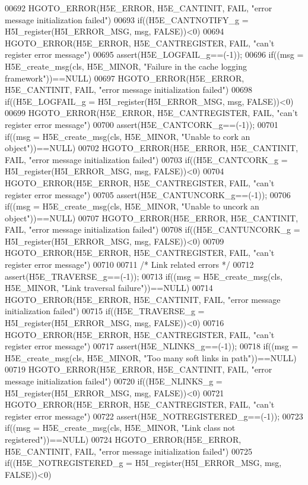\begin{DoxyCode}
00692     HGOTO\_ERROR(H5E\_ERROR, H5E\_CANTINIT, FAIL, "error message initialization failed")
00693 if((H5E\_CANTNOTIFY\_g = H5I\_register(H5I\_ERROR\_MSG, msg, FALSE))<0)
00694     HGOTO\_ERROR(H5E\_ERROR, H5E\_CANTREGISTER, FAIL, "can't register error message")
00695 assert(H5E\_LOGFAIL\_g==(-1));
00696 if((msg = H5E\_create\_msg(cls, H5E\_MINOR, "Failure in the cache logging framework"))==NULL)
00697     HGOTO\_ERROR(H5E\_ERROR, H5E\_CANTINIT, FAIL, "error message initialization failed")
00698 if((H5E\_LOGFAIL\_g = H5I\_register(H5I\_ERROR\_MSG, msg, FALSE))<0)
00699     HGOTO\_ERROR(H5E\_ERROR, H5E\_CANTREGISTER, FAIL, "can't register error message")
00700 assert(H5E\_CANTCORK\_g==(-1));
00701 if((msg = H5E\_create\_msg(cls, H5E\_MINOR, "Unable to cork an \textcolor{keywordtype}{object}"))==NULL)
00702     HGOTO\_ERROR(H5E\_ERROR, H5E\_CANTINIT, FAIL, "error message initialization failed")
00703 if((H5E\_CANTCORK\_g = H5I\_register(H5I\_ERROR\_MSG, msg, FALSE))<0)
00704     HGOTO\_ERROR(H5E\_ERROR, H5E\_CANTREGISTER, FAIL, "can't register error message")
00705 assert(H5E\_CANTUNCORK\_g==(-1));
00706 if((msg = H5E\_create\_msg(cls, H5E\_MINOR, "Unable to uncork an \textcolor{keywordtype}{object}"))==NULL)
00707     HGOTO\_ERROR(H5E\_ERROR, H5E\_CANTINIT, FAIL, "error message initialization failed")
00708 if((H5E\_CANTUNCORK\_g = H5I\_register(H5I\_ERROR\_MSG, msg, FALSE))<0)
00709     HGOTO\_ERROR(H5E\_ERROR, H5E\_CANTREGISTER, FAIL, "can't register error message")
00710 
00711 \textcolor{comment}{/* Link related errors */}
00712 assert(H5E\_TRAVERSE\_g==(-1));
00713 if((msg = H5E\_create\_msg(cls, H5E\_MINOR, "Link traversal failure"))==NULL)
00714     HGOTO\_ERROR(H5E\_ERROR, H5E\_CANTINIT, FAIL, "error message initialization failed")
00715 if((H5E\_TRAVERSE\_g = H5I\_register(H5I\_ERROR\_MSG, msg, FALSE))<0)
00716     HGOTO\_ERROR(H5E\_ERROR, H5E\_CANTREGISTER, FAIL, "can't register error message")
00717 assert(H5E\_NLINKS\_g==(-1));
00718 if((msg = H5E\_create\_msg(cls, H5E\_MINOR, "Too many soft links in path"))==NULL)
00719     HGOTO\_ERROR(H5E\_ERROR, H5E\_CANTINIT, FAIL, "error message initialization failed")
00720 if((H5E\_NLINKS\_g = H5I\_register(H5I\_ERROR\_MSG, msg, FALSE))<0)
00721     HGOTO\_ERROR(H5E\_ERROR, H5E\_CANTREGISTER, FAIL, "can't register error message")
00722 assert(H5E\_NOTREGISTERED\_g==(-1));
00723 if((msg = H5E\_create\_msg(cls, H5E\_MINOR, "Link class not registered"))==NULL)
00724     HGOTO\_ERROR(H5E\_ERROR, H5E\_CANTINIT, FAIL, "error message initialization failed")
00725 if((H5E\_NOTREGISTERED\_g = H5I\_register(H5I\_ERROR\_MSG, msg, FALSE))<0)

\end{DoxyCode}
